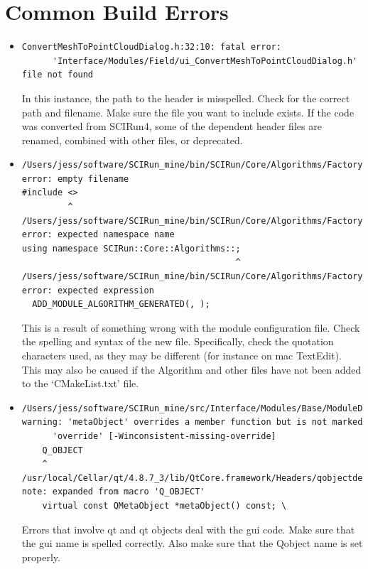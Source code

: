\documentclass[fleqn,11pt,openany]{book}
\begin{document}
\section{Common Build Errors}
\label{sec:errors}

\begin{itemize}
\item
\begin{verbatim}
ConvertMeshToPointCloudDialog.h:32:10: fatal error: 
      'Interface/Modules/Field/ui_ConvertMeshToPointCloudDialog.h' file not found
\end{verbatim}
In this instance, the path to the header is misspelled.  Check for the correct path and filename.  Make sure the file you want to include exists.  If the code was converted from SCIRun4, some of the dependent header files are renamed, combined with other files, or deprecated.  
\item
\begin{verbatim}
/Users/jess/software/SCIRun_mine/bin/SCIRun/Core/Algorithms/Factory/AlgorithmFactoryImpl_Generated.cc:4:10: error: empty filename
#include <>
         ^
/Users/jess/software/SCIRun_mine/bin/SCIRun/Core/Algorithms/Factory/AlgorithmFactoryImpl_Generated.cc:21:43: error: expected namespace name
using namespace SCIRun::Core::Algorithms::;
                                          ^
/Users/jess/software/SCIRun_mine/bin/SCIRun/Core/Algorithms/Factory/AlgorithmFactoryImpl_Generated.cc:39:3: error: expected expression
  ADD_MODULE_ALGORITHM_GENERATED(, );
\end{verbatim}
This is a result of something wrong with the module configuration file.  Check the spelling and syntax of the new file.  Specifically, check the quotation characters used, as they may be different (for instance on mac TextEdit).  This may also be caused if the Algorithm and other files have not been added to the `CMakeList.txt' file.  
\item
\begin{verbatim}
/Users/jess/software/SCIRun_mine/src/Interface/Modules/Base/ModuleDialogGeneric.h:71:5: warning: 'metaObject' overrides a member function but is not marked
      'override' [-Winconsistent-missing-override]
    Q_OBJECT
    ^
/usr/local/Cellar/qt/4.8.7_3/lib/QtCore.framework/Headers/qobjectdefs.h:162:32: note: expanded from macro 'Q_OBJECT'
    virtual const QMetaObject *metaObject() const; \
\end{verbatim}
Errors that involve qt and qt objects deal with the gui code.  Make sure that the gui name is spelled correctly.  Also make sure that the Qobject name is set properly.  
\end{itemize}
      
\end{document}
